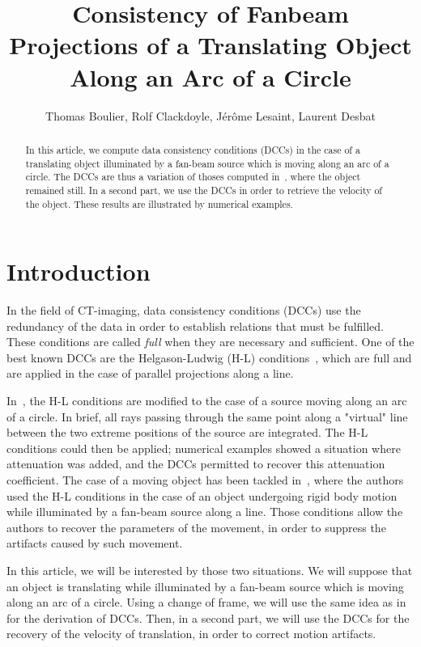 \documentclass[9pt,technote]{IEEEtran}
\title{Consistency of Fanbeam Projections of a Translating Object Along an Arc of a Circle}
\author{Thomas Boulier, Rolf Clackdoyle, Jérôme Lesaint, Laurent Desbat}
\date{}
\numberwithin{equation}{section}
\begin{document}
\maketitle

\begin{abstract}
In this article, we compute data consistency conditions (DCCs) in the case of a translating object illuminated by a fan-beam source which is moving along an arc of a circle. The DCCs are thus a variation of thoses computed in~\cite{clackdoyle2015consistency}, where the object remained still. In a second part, we use the DCCs in order to retrieve the velocity of the object. These results are illustrated by numerical examples.
\end{abstract}

\section{Introduction}

In the field of CT-imaging, data consistency conditions (DCCs) use the redundancy of the data in order to establish relations that must be fulfilled. These conditions are called \emph{full} when they are necessary and sufficient. One of the best known DCCs are the Helgason-Ludwig (H-L) conditions~\cite{helgason1980radon,ludwig1966radon}, which are full and are applied in the case of parallel projections along a line.

In~\cite{clackdoyle2015consistency}, the H-L conditions are modified to the case of a source moving along an arc of a circle. In brief, all rays passing through the same point along a "virtual" line between the two extreme positions of the source are integrated. The H-L conditions could then be applied; numerical examples showed a situation where attenuation was added, and the DCCs permitted to recover this attenuation coefficient. The case of a moving object has been tackled in~\cite{yu2006data,yu2007data}, where the authors used the H-L conditions in the case of an object undergoing rigid body motion while illuminated by a fan-beam source along a line. Those conditions allow the authors to recover the parameters of the movement, in order to suppress the artifacts caused by such movement.

In this article, we will be interested by those two situations. We will suppose that an object is translating while illuminated by a fan-beam source which is moving along an arc of a circle. Using a change of frame, we will use the same idea as in~\cite{clackdoyle2015consistency} for the derivation of DCCs. Then, in a second part, we will use the DCCs for the recovery of the velocity of translation, in order to correct motion artifacts.
\end{document}
